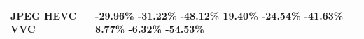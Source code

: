 \begin{tabular}{ll}
\toprule
JPEG HEVC VVC & -29.96\% -31.22\% -48.12\% 19.40\% -24.54\% -41.63\% 8.77\% -6.32\% -54.53\% \\
\midrule
\bottomrule
\end{tabular}
